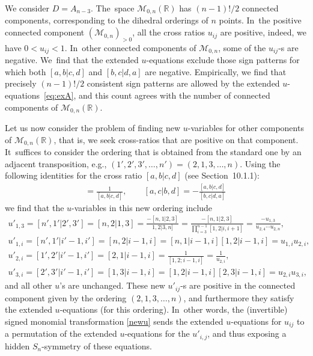 \documentclass[10pt,a4paper]{amsart}
\def\R{{\mathbb R}}
\def\M{{\mathcal{M}}}
\numberwithin{equation}{section}
\begin{document}
\medskip{} We consider $D = A_{n-3}$. The~space $\M_{0,n}(\R)$ has $(n{-}1)!/2$ connected components, corresponding to the dihedral orderings of $n$ points. In~the positive connected component $(\M_{0,n})_{> 0}$, all the cross ratios $u_{ij}$ are positive, indeed, we have $0 < u_{ij} < 1$. In~other connected components of $\M_{0,n}$, some of the $u_{ij}$-s are negative. We~find that the extended $u$-equations exclude those sign patterns for which both $[a, b | c, d]$ and $[b, c | d, a]$ are negative. Empirically, we find that precisely $(n{-}1)!/2$ consistent sign patterns are allowed by the extended $u$-equations~\eqref{eq:exA}, and this count agrees with the number of connected components of $\M_{0,n}(\R)$.

Let us now consider the problem of finding new $u$-variables for other components of $\M_{0,n}(\R)$, that is, we seek cross-ratios that are positive on that component. It~suffices to consider the orde\-ring that is obtained from the standard one by an adjacent transposition, e.g., $(1',2',3',\dots, n')=(2,1,3,\dots, n)$. Using the following identities for the cross ratio $[a, b | c, d]$ (see Section~10.1.1):
\begin{gather*}
[a, b| d, c]=\frac{1}{[a,b| c,d]},\qquad
[a, c| b,d]=-\frac{[a, b| c, d]}{[b,c | d,a]}\,
\end{gather*}
we find that the $u$-variables in this new ordering include
\begin{gather}
 u'_{1,3}=[n', 1'| 2', 3']=[n, 2 | 1, 3]=\frac{-[n, 1|2,3]}{1,2| 3, n]}=\frac{-[n,1|2,3]}{\prod_{i=3}^{n{-}1} [1,2 | i,i{+}1]}=\frac{-u_{1,3}}{u_{2,4} \cdots u_{2,n}}, \nonumber
 \\
 u'_{1, i}=[n', 1'| i'{-}1, i']=[n, 2| i-1, i]=[n,1| i{-}1,i][1,2| i{-}1,i]=u_{1,i}u_{2,i}, \nonumber
\\
 u'_{2, i}=[1', 2'| i'{-}1, i']=[2,1 | i{-}1, i]=\frac{1}{[1,2; i{-}1, i]}=\frac{1}{u_{2,i}}, \nonumber
\\
 u'_{3, i}=[2',3'| i'{-}1, i']=[1,3 |i{-}1, i]=[1,2 | i{-}1, i][2, 3 | i{-}1, i]=u_{2,i} u_{3,i},
\label{newu}
\end{gather}
and all other $u$'s are unchanged. These new $u'_{ij}$-s are positive in the connected component given by the ordering $(2,1,3,\dots, n)$, and furthermore they satisfy the extended $u$-equations (for this ordering). In~other words, the (invertible) signed monomial transformation \eqref{newu} sends the extended $u$-equations for $u_{ij}$ to a permutation of the extended $u$-equations for the $u'_{i,j}$, and thus exposing a hidden $S_n$-symmetry of these equations.
\end{document}
